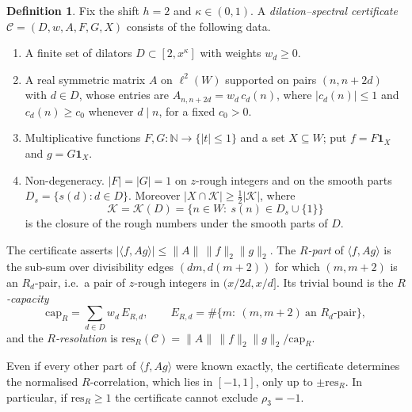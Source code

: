 \documentclass[11pt]{amsart}
\theoremstyle{definition}
\newtheorem{definition}[theorem]{Definition}
\theoremstyle{remark}
\newcommand{\N}{\mathbb{N}}
\newcommand{\res}{\mathrm{res}}
\newcommand{\capR}{\mathrm{cap}}
\begin{document}
\begin{definition}\label{def:cert}
Fix the shift $h=2$ and $\kappa\in(0,1)$. A \emph{dilation--spectral certificate} $\mathcal C=(D,w,A,F,G,X)$ consists of the following data.
\begin{enumerate}
\item[(A1)] A finite set of dilators $D\subset[2,x^\kappa]$ with weights $w_d\ge0$.
\item[(A2)] A real symmetric matrix $A$ on $\ell^2(W)$ supported on pairs $(n,n+2d)$ with $d\in D$, whose entries are $A_{n,n+2d}=w_d\,c_d(n)$, where $|c_d(n)|\le1$ and $c_d(n)\ge c_0$ whenever $d\mid n$, for a fixed $c_0>0$.
\item[(A3)] Multiplicative functions $F,G:\N\to\{|t|\le1\}$ and a set $X\subseteq W$; put $f=F\mathbf 1_X$ and $g=G\mathbf 1_X$.
\item[(A4)] Non-degeneracy. $|F|=|G|=1$ on $z$-rough integers and on the smooth parts $D_s=\{s(d):d\in D\}$. Moreover $|X\cap\mathcal K|\ge\frac12|\mathcal K|$, where
\[
\mathcal K=\mathcal K(D)=\{n\in W:\ s(n)\in D_s\cup\{1\}\}
\]
is the closure of the rough numbers under the smooth parts of $D$.
\end{enumerate}
The certificate asserts $|\langle f,Ag\rangle|\le\|A\|\,\|f\|_2\|g\|_2$. The \emph{$R$-part} of $\langle f,Ag\rangle$ is the sub-sum over divisibility edges $(dm,d(m+2))$ for which $(m,m+2)$ is an $R_d$-pair, i.e.\ a pair of $z$-rough integers in $(x/2d,x/d]$. Its trivial bound is the \emph{$R$-capacity}
\[
\capR_R=\sum_{d\in D}w_d\,E_{R,d},\qquad E_{R,d}=\#\{m:\ (m,m+2)\ \text{an }R_d\text{-pair}\},
\]
and the \emph{$R$-resolution} is $\res_R(\mathcal C)=\|A\|\,\|f\|_2\|g\|_2/\capR_R$.
\end{definition}

Even if every other part of $\langle f,Ag\rangle$ were known exactly, the certificate determines the normalised $R$-correlation, which lies in $[-1,1]$, only up to $\pm\res_R$. In particular, if $\res_R\ge1$ the certificate cannot exclude $\rho_3=-1$.
\end{document}
